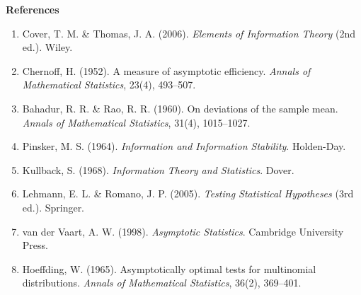 \documentclass[
  12pt,
]{article}
\providecommand{\tightlist}{%
  \setlength{\itemsep}{0pt}\setlength{\parskip}{0pt}}
\begin{document}
\textbf{References}

\begin{enumerate}
\def\labelenumi{\arabic{enumi}.}
\tightlist
\item
  Cover, T. M. \& Thomas, J. A. (2006). \emph{Elements of Information
  Theory} (2nd ed.). Wiley.
\item
  Chernoff, H. (1952). A measure of asymptotic efficiency. \emph{Annals
  of Mathematical Statistics}, 23(4), 493--507.
\item
  Bahadur, R. R. \& Rao, R. R. (1960). On deviations of the sample mean.
  \emph{Annals of Mathematical Statistics}, 31(4), 1015--1027.
\item
  Pinsker, M. S. (1964). \emph{Information and Information Stability}.
  Holden-Day.
\item
  Kullback, S. (1968). \emph{Information Theory and Statistics}. Dover.
\item
  Lehmann, E. L. \& Romano, J. P. (2005). \emph{Testing Statistical
  Hypotheses} (3rd ed.). Springer.
\item
  van der Vaart, A. W. (1998). \emph{Asymptotic Statistics}. Cambridge
  University Press.
\item
  Hoeffding, W. (1965). Asymptotically optimal tests for multinomial
  distributions. \emph{Annals of Mathematical Statistics}, 36(2),
  369--401.
\end{enumerate}
\end{document}
